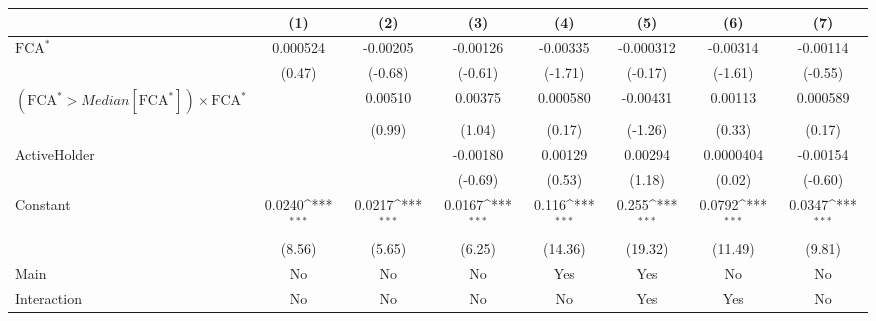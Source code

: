 {
\def\sym#1{\ifmmode^{#1}\else\(^{#1}\)\fi}
\begin{tabular}{l*{7}{c}}
\hline\hline
                    &\multicolumn{1}{c}{(1)}         &\multicolumn{1}{c}{(2)}         &\multicolumn{1}{c}{(3)}         &\multicolumn{1}{c}{(4)}         &\multicolumn{1}{c}{(5)}         &\multicolumn{1}{c}{(6)}         &\multicolumn{1}{c}{(7)}         \\
\hline
$ \text{FCA}^* $    &    0.000524         &    -0.00205         &    -0.00126         &    -0.00335         &   -0.000312         &    -0.00314         &    -0.00114         \\
                    &      (0.47)         &     (-0.68)         &     (-0.61)         &     (-1.71)         &     (-0.17)         &     (-1.61)         &     (-0.55)         \\
[1em]
 $ (\text{FCA}^* > Median[\text{FCA}^*]) \times {\text{FCA} ^*}  $ &                     &     0.00510         &     0.00375         &    0.000580         &    -0.00431         &     0.00113         &    0.000589         \\
                    &                     &      (0.99)         &      (1.04)         &      (0.17)         &     (-1.26)         &      (0.33)         &      (0.17)         \\
[1em]
ActiveHolder        &                     &                     &    -0.00180         &     0.00129         &     0.00294         &   0.0000404         &    -0.00154         \\
                    &                     &                     &     (-0.69)         &      (0.53)         &      (1.18)         &      (0.02)         &     (-0.60)         \\
[1em]
Constant            &      0.0240\sym{***}&      0.0217\sym{***}&      0.0167\sym{***}&       0.116\sym{***}&       0.255\sym{***}&      0.0792\sym{***}&      0.0347\sym{***}\\
                    &      (8.56)         &      (5.65)         &      (6.25)         &     (14.36)         &     (19.32)         &     (11.49)         &      (9.81)         \\
\hline
Main                &          No         &          No         &          No         &         Yes         &         Yes         &          No         &          No         \\
Interaction         &          No         &          No         &          No         &          No         &         Yes         &         Yes         &          No         \\

\end{tabular}}
